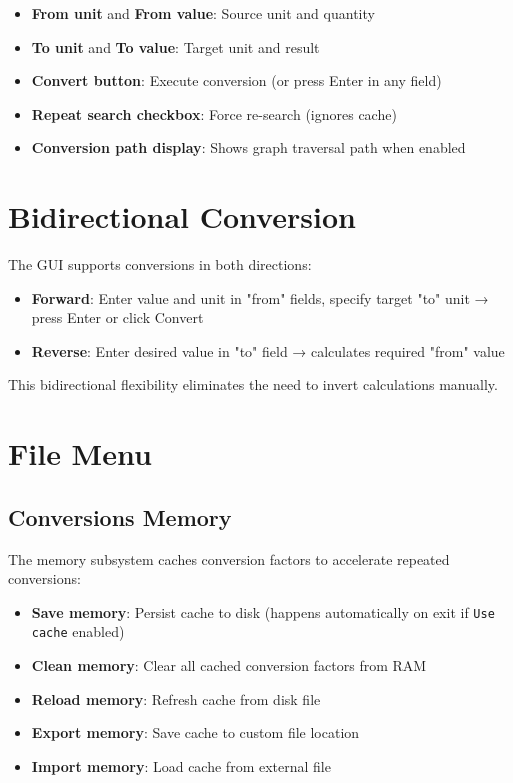 \documentclass[11pt,a4paper]{report}
\begin{document}
\begin{itemize}
\item \textbf{From unit} and \textbf{From value}: Source unit and quantity
\item \textbf{To unit} and \textbf{To value}: Target unit and result
\item \textbf{Convert button}: Execute conversion (or press Enter in any field)
\item \textbf{Repeat search checkbox}: Force re-search (ignores cache)
\item \textbf{Conversion path display}: Shows graph traversal path when enabled
\end{itemize}

\section{Bidirectional Conversion}

The GUI supports conversions in both directions:

\begin{itemize}
\item \textbf{Forward}: Enter value and unit in "from" fields, specify target "to" unit → press Enter or click Convert
\item \textbf{Reverse}: Enter desired value in "to" field → calculates required "from" value
\end{itemize}

This bidirectional flexibility eliminates the need to invert calculations manually.

\section{File Menu}

\subsection{Conversions Memory}

The memory subsystem caches conversion factors to accelerate repeated conversions:

\begin{itemize}
\item \textbf{Save memory}: Persist cache to disk (happens automatically on exit if \texttt{Use cache} enabled)
\item \textbf{Clean memory}: Clear all cached conversion factors from RAM
\item \textbf{Reload memory}: Refresh cache from disk file
\item \textbf{Export memory}: Save cache to custom file location
\item \textbf{Import memory}: Load cache from external file
\end{itemize}
\end{document}
